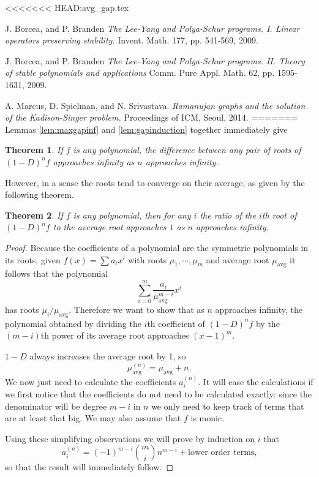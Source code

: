 \documentclass[11pt]{article}
\DeclareMathOperator{\avg}{avg}
\newtheorem{theorem}{Theorem}[section]
\begin{document}
<<<<<<< HEAD:avg_gap.tex
\begin{thebibliography}{1}

   J. Borcea, and P. Branden {\em The Lee-Yang and Polya-Schur programs. I. Linear operators preserving stability.} Invent. Math. 177, pp. 541-569, 2009.

  J. Borcea, and P. Branden {\em The Lee-Yang and Polya-Schur programs. II. Theory of stable polynomials and applications} Comm. Pure Appl. Math. 62, pp. 1595-1631, 2009.

    A. Marcus, D. Spielman, and N. Srivastava. {\em Ramanujan graphs and the solution of the Kadison-Singer problem.} Proceedings of ICM, Seoul, 2014.
=======
Lemmas \ref{lem:maxgapinf} and \ref{lem:gapinduction} together immediately give
\begin{theorem}
	If $f$ is any polynomial, the difference between any pair of roots of $(1-D)^n f$ approaches infinity as $n$ approaches infinity.
\end{theorem}

However, in a sense the roots tend to converge on their average, as given by the following theorem.
\begin{theorem}
	If $f$ is any polynomial, then for any $i$ the ratio of the $i$th root of $(1-D)^nf$ to the average root approaches $1$ as $n$ approaches infinity.
\end{theorem}
\begin{proof}
	Because the coefficients of a polynomial are the symmetric polynomials in its roots, given $f(x)=\sum a_i x^i$ with roots $\mu_1,\cdots,\mu_m$ and average root $\mu_{\avg}$ it follows that the polynomial
		\[ \sum_{i=0}^m \frac{a_i}{\mu_{\avg}^{m-i}}x^i \]
	has roots $\mu_i/\mu_{\avg}$. Therefore we want to show that as $n$ approaches infinity, the polynomial obtained by dividing the $i$th coefficient of $(1-D)^n f$ by the $(m-i)$th power of its average root approaches $(x-1)^m$.
	
	$1-D$ always increases the average root by 1, so
		\[ \mu_{\avg}^{(n)} = \mu_{\avg}+n. \]
	We now just need to calculate the coefficients $a_i^{(n)}$. It will ease the calculations if we first notice that the coefficients do not need to be calculated exactly: since the denominator will be degree $m-i$ in $n$ we only need to keep track of terms that are at least that big. We may also assume that $f$ is monic.
	
	Using these simplifying observations we will prove by induction on $i$ that
		\[ a_{i}^{(n)} = (-1)^{m-i}\binom{m}{i}n^{m-i} + \text{lower order terms,} \]
	so that the result will immediately follow.
	

\end{proof}
\end{thebibliography}
\end{document}
